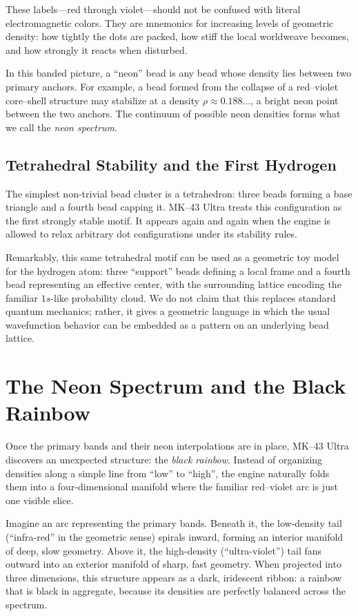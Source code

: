 These labels---red through violet---should not be confused with literal
electromagnetic colors. They are mnemonics for increasing levels of geometric
density: how tightly the dots are packed, how stiff the local worldweave
becomes, and how strongly it reacts when disturbed.

In this banded picture, a ``neon'' bead is any bead whose density lies between
two primary anchors. For example, a bead formed from the collapse of a
red--violet core--shell structure may stabilize at a density
$\rho \approx 0.188\ldots$, a bright neon point between the two anchors.
The continuum of possible neon densities forms what we call the \emph{neon
spectrum}.

\section{Tetrahedral Stability and the First Hydrogen}
The simplest non-trivial bead cluster is a tetrahedron: three beads forming a
base triangle and a fourth bead capping it. MK--43 Ultra treats this
configuration as the first strongly stable motif. It appears again and again
when the engine is allowed to relax arbitrary dot configurations under its
stability rules.

Remarkably, this same tetrahedral motif can be used as a geometric toy model
for the hydrogen atom: three ``support'' beads defining a local frame and a
fourth bead representing an effective center, with the surrounding lattice
encoding the familiar $1s$-like probability cloud. We do not claim that this
replaces standard quantum mechanics; rather, it gives a geometric language in
which the usual wavefunction behavior can be embedded as a pattern on an
underlying bead lattice.

\chapter{The Neon Spectrum and the Black Rainbow}
Once the primary bands and their neon interpolations are in place, MK--43
Ultra discovers an unexpected structure: the \emph{black rainbow}. Instead of
organizing densities along a simple line from ``low'' to ``high'', the engine
naturally folds them into a four-dimensional manifold where the familiar
red--violet arc is just one visible slice.

Imagine an arc representing the primary bands. Beneath it, the low-density
tail (``infra-red'' in the geometric sense) spirals inward, forming an
interior manifold of deep, slow geometry. Above it, the high-density
(``ultra-violet'') tail fans outward into an exterior manifold of sharp,
fast geometry. When projected into three dimensions, this structure appears as
a dark, iridescent ribbon: a rainbow that is black in aggregate, because its
densities are perfectly balanced across the spectrum.

